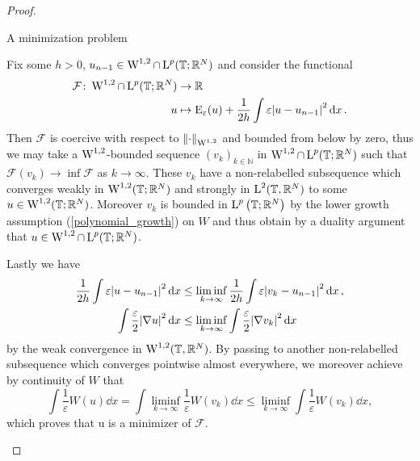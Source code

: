 \begin{proof}
	\begin{description}[wide=0pt]
		\item[Step 1:] A minimization problem
		
		Fix some $ h > 0 $, $ u_{ n - 1 } \in \operatorname{W}^{1 , 2 }\cap \operatorname{L}^{ p } ( \operatorname{\mathbb{T}}; \mathbb{ R }^{ N } ) $ and consider the functional
		\begin{align}
			\label{de_giorgi_min_functional}
			\mathcal{ F } \colon \operatorname{W}^{ 1, 2 } \cap \operatorname{L}^{ p } ( \operatorname{\mathbb{T}} ; \mathbb{ R }^{ N } )
			& \to
			\mathbb{ R }
			\\
			u & \mapsto 
			\operatorname{E}_{ \varepsilon } ( u ) + 
			\frac{ 1 }{ 2h } \int \varepsilon \abs{ u - u_{ n - 1 } }^{ 2 } \dd{x }
			\notag .
		\end{align}
		Then $ \mathcal{ F } $ is coercive with respect to 
		$ \norm{ \cdot }_{ \operatorname{W}^{ 1, 2 } } $ 
		and bounded from below by zero, thus we may take a $ \operatorname{W}^{ 1 , 2 } $-bounded sequence  
		$ (v_{ k } )_{ k \in \mathbb{ N } } $ in $ \operatorname{W}^{ 1 , 2} \cap \operatorname{L}^{ p } ( \operatorname{\mathbb{T}} ; \mathbb{ R }^{ N } ) $ such that 
		$ \mathcal{ F } ( v_{ k } ) \to \inf \mathcal{ F } $ as $ k \to \infty $. 
		These $ v_{ k } $ have a non-relabelled subsequence which converges weakly in $ \operatorname{W}^{ 1 , 2 } ( \operatorname{\mathbb{T}} ; \mathbb{ R }^{ N } ) $ and strongly in $ \operatorname{L}^{ 2 } ( \operatorname{\mathbb{T}}, \mathbb{ R }^{ N } ) $ to some $ u \in \operatorname{W}^{ 1, 2 } ( \operatorname{\mathbb{T}}; \mathbb{ R }^{ N } ) $.
		Moreover $ v_{ k } $ is bounded in $ \operatorname{L}^{ p } \left( \operatorname{\mathbb{T}} ; \mathbb{ R }^{ N } \right)$ by the lower growth assumption (\ref{polynomial_growth}) on $ W $
		and thus obtain by a duality argument that $ u \in \operatorname{W}^{ 1 , 2 } \cap \operatorname{L}^{ p } ( \operatorname{\mathbb{T}} ; \mathbb{ R }^{ N } ) $.
		
		Lastly we have 
		\begin{align}
			\frac{ 1 }{ 2 h }
			\int \varepsilon \abs{ u - u_{ n - 1 } }^{ 2 } \dd{ x}
			& \leq
			\liminf_{ k \to \infty }
			\frac{ 1 }{ 2h }
			\int \varepsilon \abs{ v_{ k } - u_{ n -1 } }^{ 2 } \dd{ x },
			\\
			\int \frac{ \varepsilon }{ 2 } \abs{ \nabla u }^{ 2 } \dd{ x }
			& \leq
			\liminf_{ k \to \infty }
				\int \frac{ \varepsilon }{ 2 } \abs{ \nabla v_{ k } }^{ 2 } \dd{ x }
		\end{align}
	by the weak convergence in $ \operatorname{W}^{ 1 , 2 } ( \operatorname{\mathbb{T}} , \mathbb{ R }^{ N } )$.
	By passing to another non-relabelled subsequence which converges pointwise almost everywhere, we moreover achieve by continuity of $ W $ that
	\begin{equation*}
		\int \frac{ 1 }{ \varepsilon } W ( u ) \dd{ x }
		=
		\int \liminf_{ k \to \infty } \frac{ 1 }{ \varepsilon } W ( v_{k } ) \dd{ x }
		\leq
		\liminf_{ k \to \infty } \int \frac{ 1 }{ \varepsilon } W ( v_{ k } ) \dd{x},
	\end{equation*}
	which proves that u is a minimizer of $ \mathcal{ F } $.
	

\end{description}
\end{proof}
